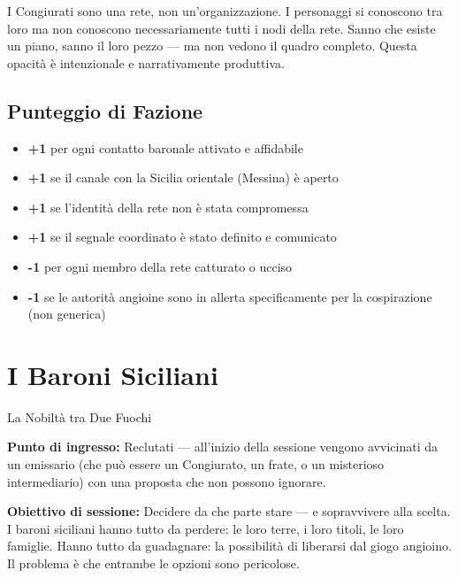 I Congiurati sono una rete, non un'organizzazione. I personaggi si
conoscono tra loro ma non conoscono necessariamente tutti i nodi
della rete. Sanno che esiste un piano, sanno il loro pezzo — ma
non vedono il quadro completo. Questa opacità è intenzionale e
narrativamente produttiva.

\subsection{Punteggio di Fazione}

\begin{itemize}[nosep]
  \item \textbf{+1} per ogni contatto baronale attivato e affidabile
  \item \textbf{+1} se il canale con la Sicilia orientale (Messina) è aperto
  \item \textbf{+1} se l'identità della rete non è stata compromessa
  \item \textbf{+1} se il segnale coordinato è stato definito e comunicato
  \item \textbf{-1} per ogni membro della rete catturato o ucciso
  \item \textbf{-1} se le autorità angioine sono in allerta specificamente
    per la cospirazione (non generica)
\end{itemize}


\secsep

\section{I Baroni Siciliani}
\textcolor{oro}{\cinzel\large La Nobiltà tra Due Fuochi}

\filetto

\textbf{Punto di ingresso:} Reclutati — all'inizio della sessione vengono
avvicinati da un emissario (che può essere un Congiurato, un frate,
o un misterioso intermediario) con una proposta che non possono ignorare.

\textbf{Obiettivo di sessione:} Decidere da che parte stare — e sopravvivere
alla scelta. I baroni siciliani hanno tutto da perdere: le loro terre, i
loro titoli, le loro famiglie. Hanno tutto da guadagnare: la possibilità
di liberarsi dal giogo angioino. Il problema è che entrambe le opzioni
sono pericolose.

